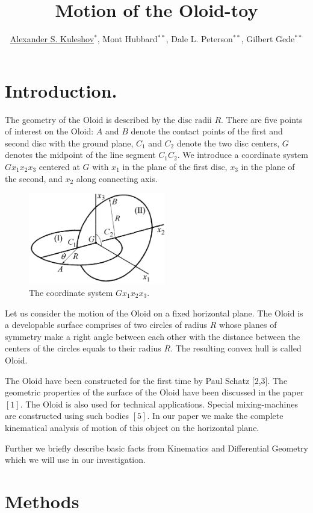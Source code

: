 \documentclass[10pt]{enoc2011}
\title{Motion of the Oloid-toy}
\author{\underline{Alexander S. Kuleshov}$^{\ast}$,
                   Mont Hubbard$^{\ast\ast}$,
                   Dale L. Peterson$^{\ast\ast}$,
                   Gilbert Gede$^{\ast\ast}$}
\begin{document}

\section*{Introduction.}

The geometry of the Oloid is described by the disc radii $R$.  There are five
points of interest on the Oloid: $A$ and $B$ denote the contact points of the
first and second disc with the ground plane, $C_1$ and $C_2$ denote the two
disc centers, $G$ denotes the midpoint of the line segment $C_1C_2$.  We
introduce a coordinate system $Gx_1x_2x_3$ centered at $G$ with $x_1$ in the
plane of the first disc, $x_3$ in the plane of the second, and $x_2$ along
connecting axis.
\begin{figure}[h]
\centering
\includegraphics[height=4cm]{Oloid2}
\caption{The coordinate system $Gx_1x_2x_3$.}
\end{figure}




Let us consider the motion of the Oloid on a fixed horizontal plane. The Oloid is a developable surface comprises of two circles of radius $R$ whose planes of symmetry make a right angle between each other with the distance between the centers of the circles equals to their radius $R$. The resulting convex hull is called Oloid.

The Oloid have been constructed for the first time by Paul Schatz $[2$,$3]$. The geometric properties of the surface of the Oloid have been discussed in the paper $[1]$. The Oloid is also used for technical applications. Special mixing-machines are constructed using such bodies $[5]$. In our paper we make the complete kinematical analysis of motion of this object on the horizontal plane.

Further we briefly describe basic facts from Kinematics and Differential Geometry which we will use in our investigation.

\section*{Methods}
\end{document}
